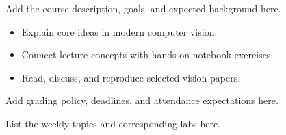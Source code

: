 \documentclass[11pt]{article}
\begin{document}
\lectureheading

Add the course description, goals, and expected background here.

\begin{itemize}
  \item Explain core ideas in modern computer vision.
  \item Connect lecture concepts with hands-on notebook exercises.
  \item Read, discuss, and reproduce selected vision papers.
\end{itemize}

Add grading policy, deadlines, and attendance expectations here.

List the weekly topics and corresponding labs here.

\printbibliography
\end{document}
